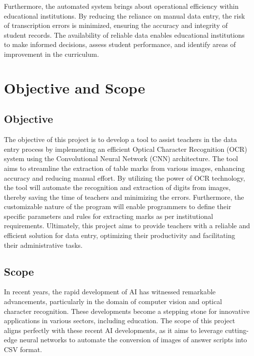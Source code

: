 \noindent Furthermore, the automated system brings about operational efficiency within educational institutions. By reducing the reliance on manual data entry, the risk of transcription errors is minimized, ensuring the accuracy and integrity of student records. The availability of reliable data enables educational institutions to make informed decisions, assess student performance, and identify areas of improvement in the curriculum.

\clearpage

\section{Objective and Scope}

\subsection{Objective}

The objective of this project is to develop a tool to assist teachers in the data entry process by implementing an efficient Optical Character Recognition (OCR) system using the Convolutional Neural Network (CNN) architecture. The tool aims to streamline the extraction of table marks from various images, enhancing accuracy and reducing manual effort. By utilizing the power of OCR technology, the tool will automate the recognition and extraction of digits from images, thereby saving the time of teachers and minimizing the errors. Furthermore, the customizable nature of the program will enable programmers to define their specific parameters and rules for extracting marks as per institutional requirements. Ultimately, this project aims to provide teachers with a reliable and efficient solution for data entry, optimizing their productivity and facilitating their administrative tasks.

\subsection{Scope}

In recent years, the rapid development of AI has witnessed remarkable advancements, particularly in the domain of computer vision and optical character recognition. These developments become a stepping stone for innovative applications in various sectors, including education. The scope of this project aligns perfectly with these recent AI developments, as it aims to leverage cutting-edge neural networks to automate the conversion of images of answer scripts into CSV format.

